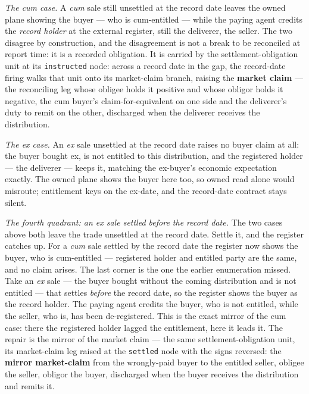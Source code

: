 \documentclass[11pt,a4paper]{article}
\begin{document}
\emph{The cum case.} A \emph{cum} sale still unsettled at the record date leaves the
owned plane showing the buyer --- who is cum-entitled --- while the paying agent
credits the \emph{record holder} at the external register, still the deliverer, the
seller. The two disagree by construction, and the disagreement is not a break to be
reconciled at report time: it is a recorded obligation. It is carried by the
settlement-obligation unit at its \texttt{instructed} node: across a record date in the
gap, the record-date firing walks that unit onto its market-claim branch, raising the
\textbf{market claim} --- the reconciling leg whose obligee holds it positive and whose
obligor holds it negative, the cum buyer's claim-for-equivalent on one side and the
deliverer's duty to remit on the other, discharged when the deliverer receives the
distribution.

\emph{The ex case.} An \emph{ex} sale unsettled at the record date raises no buyer
claim at all: the buyer bought ex, is not entitled to this distribution, and the
registered holder --- the deliverer --- keeps it, matching the ex-buyer's economic
expectation exactly. The owned plane shows the buyer here too, so owned read alone
would misroute; entitlement keys on the ex-date, and the record-date contract stays
silent.

\emph{The fourth quadrant: an ex sale settled before the record date.} The two cases
above both leave the trade unsettled at the record date. Settle it, and the register
catches up. For a \emph{cum} sale settled by the record date the register now shows
the buyer, who is cum-entitled --- registered holder and entitled party are the same,
and no claim arises. The last corner is the one the earlier enumeration missed. Take
an \emph{ex} sale --- the buyer bought without the coming distribution and is not
entitled --- that settles \emph{before} the record date, so the register shows the
buyer as the record holder. The paying agent credits the buyer, who is not entitled,
while the seller, who is, has been de-registered. This is the exact mirror of the cum
case: there the registered holder lagged the entitlement, here it leads it. The repair
is the mirror of the market claim --- the same settlement-obligation unit, its
market-claim leg raised at the \texttt{settled} node with the signs reversed: the
\textbf{mirror market-claim} from the wrongly-paid buyer to the entitled seller,
obligee the seller, obligor the buyer, discharged when the buyer receives the
distribution and remits it.
\end{document}
